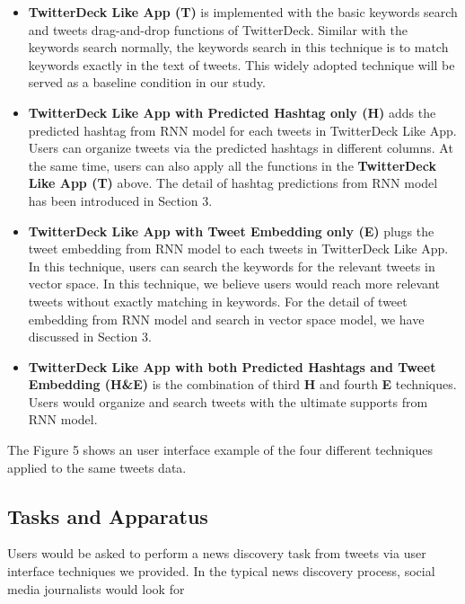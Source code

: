 \begin{itemize}
  \item \textbf{TwitterDeck Like App (T)} is implemented with the basic keywords search and tweets drag-and-drop functions of TwitterDeck. Similar with the keywords search normally, the keywords search in this technique is to match keywords exactly in the text of tweets. This widely adopted technique will be served as a baseline condition in our study. 
  
  \item \textbf{TwitterDeck Like App with Predicted Hashtag only (H)} adds the predicted hashtag from RNN model for each tweets in TwitterDeck Like App. Users can organize tweets via the predicted hashtags in different columns. At the same time, users can also apply all the functions in the \textbf{TwitterDeck Like App (T)} above. The detail of hashtag predictions from RNN model has been introduced in Section 3. 

  \item \textbf{TwitterDeck Like App with Tweet Embedding only (E)} plugs the tweet embedding from RNN model to each tweets in TwitterDeck Like App. In this technique, users can search the keywords for the relevant tweets in vector space. In this technique, we believe users would reach more relevant tweets without exactly matching in keywords. For the detail of tweet embedding from RNN model and search in vector space model, we have discussed in Section 3.   
  
  \item \textbf{TwitterDeck Like App with both Predicted Hashtags and Tweet Embedding (H\&E)} is the combination of third \textbf{H} and fourth \textbf{E} techniques. Users would organize and search tweets with the ultimate supports from RNN model. 
  
\end{itemize}

The Figure 5 shows an user interface example of the four different techniques applied to the same tweets data. 

\subsection{Tasks and Apparatus}

Users would be asked to perform a news discovery task from tweets via user interface techniques we provided. In the typical news discovery process, social media journalists would look for 




